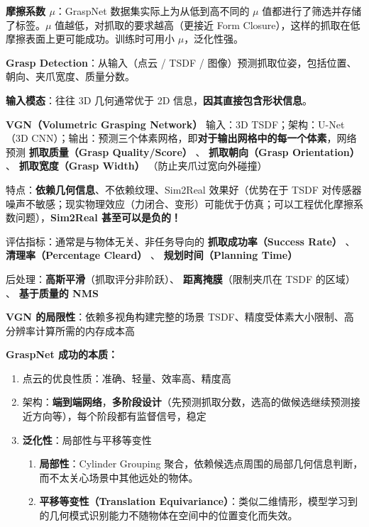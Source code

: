 \documentclass[
  8pt]{extarticle}
\providecommand{\tightlist}{%
  \setlength{\itemsep}{0pt}\setlength{\parskip}{0pt}}
\begin{document}
\begin{multicols*}{4}
\textbf{摩擦系数 \(\mu\)}：GraspNet 数据集实际上为从低到高不同的 \(\mu\)
值都进行了筛选并存储了标签。\(\mu\) 值越低，对抓取的要求越高（更接近
Form Closure），这样的抓取在低摩擦表面上更可能成功。训练时可用小
\(\mu\)，泛化性强。

\textbf{Grasp Detection}：从输入（点云 / TSDF /
图像）预测抓取位姿，包括位置、朝向、夹爪宽度、质量分数。

\textbf{输入模态}：往往 3D 几何通常优于 2D
信息，\textbf{因其直接包含形状信息}。

\textbf{VGN（Volumetric Grasping Network）} 输入：3D
TSDF；架构：U-Net（3D
CNN）；输出：预测三个体素网格，即\textbf{对于输出网格中的每一个体素}，网络预测
\textbf{抓取质量（Grasp Quality/Score）} 、 \textbf{抓取朝向（Grasp
Orientation）} 、 \textbf{抓取宽度（Grasp Width）}
（防止夹爪过宽向外碰撞）

特点：\textbf{依赖几何信息}、不依赖纹理、Sim2Real 效果好（优势在于 TSDF
对传感器噪声不敏感；现实物理效应（力闭合、变形）可能优于仿真；可以工程优化摩擦系数问题），\textbf{Sim2Real
甚至可以是负的！}

评估指标：通常是与物体无关、非任务导向的 \textbf{抓取成功率（Success
Rate）} 、 \textbf{清理率（Percentage Cleard）} 、
\textbf{规划时间（Planning Time）}

后处理：\textbf{高斯平滑}（抓取评分非阶跃）、
\textbf{距离掩膜}（限制夹爪在 TSDF 的区域） 、 \textbf{基于质量的 NMS}

\textbf{VGN 的局限性}：依赖多视角构建完整的场景
TSDF、精度受体素大小限制、高分辨率计算所需的内存成本高

\textbf{GraspNet 成功的本质：}

\begin{enumerate}
\def\labelenumi{\arabic{enumi}.}
\tightlist
\item
  点云的优良性质：准确、轻量、效率高、精度高
\item
  架构：\textbf{端到端网络}，\textbf{多阶段设计}（先预测抓取分数，选高的做候选继续预测接近方向等），每个阶段都有监督信号，稳定
\item
  \textbf{泛化性}：局部性与平移等变性

  \begin{enumerate}
  \def\labelenumii{\arabic{enumii}.}
  \tightlist
  \item
    \textbf{局部性}：Cylinder Grouping
    聚合，依赖候选点周围的局部几何信息判断，而不太关心场景中其他远处的物体。
  \item
    \textbf{平移等变性（Translation
    Equivariance）}：类似二维情形，模型学习到的几何模式识别能力不随物体在空间中的位置变化而失效。
  \end{enumerate}
\end{enumerate}


\end{multicols*}
\end{document}
